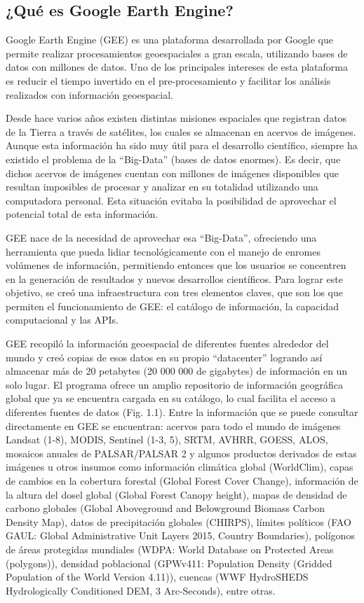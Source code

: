 \documentclass[
  12pt,
  letterpaper,
  twoside]{book}
\begin{document}
\hypertarget{quuxe9-es-google-earth-engine}{%
\subsection{¿Qué es Google Earth Engine?}\label{quuxe9-es-google-earth-engine}}

Google Earth Engine (GEE) es una plataforma desarrollada por Google que permite realizar procesamientos geoespaciales a gran escala, utilizando bases de datos con millones de datos. Uno de los principales intereses de esta plataforma es reducir el tiempo invertido en el pre-procesamiento y facilitar los análisis realizados con información geoespacial.

Desde hace varios años existen distintas misiones espaciales que registran datos de la Tierra a través de satélites, los cuales se almacenan en acervos de imágenes. Aunque esta información ha sido muy útil para el desarrollo científico, siempre ha existido el problema de la ``Big-Data'' (bases de datos enormes). Es decir, que dichos acervos de imágenes cuentan con millones de imágenes disponibles que resultan imposibles de procesar y analizar en su totalidad utilizando una computadora personal. Esta situación evitaba la posibilidad de aprovechar el potencial total de esta información.

GEE nace de la necesidad de aprovechar esa ``Big-Data'', ofreciendo una herramienta que pueda lidiar tecnológicamente con el manejo de enromes volúmenes de información, permitiendo entonces que los usuarios se concentren en la generación de resultados y nuevos desarrollos científicos. Para lograr este objetivo, se creó una infraestructura con tres elementos claves, que son los que permiten el funcionamiento de GEE: el catálogo de información, la capacidad computacional y las APIs.

GEE recopiló la información geoespacial de diferentes fuentes alrededor del mundo y creó copias de esos datos en su propio ``datacenter'' logrando así almacenar más de 20 petabytes (20 000 000 de gigabytes) de información en un solo lugar. El programa ofrece un amplio repositorio de información geográfica global que ya se encuentra cargada en su catálogo, lo cual facilita el acceso a diferentes fuentes de datos (Fig. 1.1). Entre la información que se puede consultar directamente en GEE se encuentran: acervos para todo el mundo de imágenes Landsat (1-8), MODIS, Sentinel (1-3, 5), SRTM, AVHRR, GOESS, ALOS, mosaicos anuales de PALSAR/PALSAR 2 y algunos productos derivados de estas imágenes u otros insumos como información climática global (WorldClim), capas de cambios en la cobertura forestal (Global Forest Cover Change), información de la altura del dosel global (Global Forest Canopy height), mapas de densidad de carbono globales (Global Aboveground and Belowground Biomass Carbon Density Map), datos de precipitación globales (CHIRPS), límites políticos (FAO GAUL: Global Administrative Unit Layers 2015, Country Boundaries), polígonos de áreas protegidas mundiales (WDPA: World Database on Protected Areas (polygons)), densidad poblacional (GPWv411: Population Density (Gridded Population of the World Version 4.11)), cuencas (WWF HydroSHEDS Hydrologically Conditioned DEM, 3 Arc-Seconds), entre otras.
\end{document}
